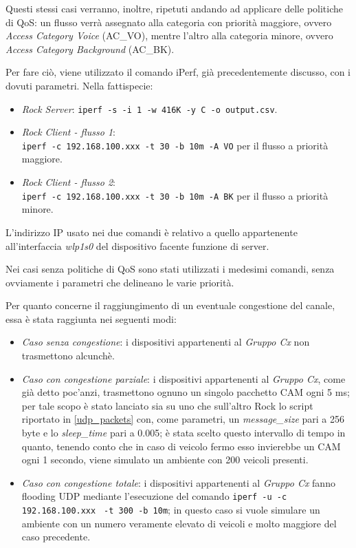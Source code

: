 Questi stessi casi verranno, inoltre, ripetuti andando ad applicare delle politiche di QoS: un flusso verrà assegnato alla categoria con priorità maggiore, ovvero \textit{Access Category Voice} (AC\_VO), mentre l'altro alla categoria minore, ovvero \textit{Access Category Background} (AC\_BK).

Per fare ciò, viene utilizzato il comando iPerf, già precedentemente discusso, con i dovuti parametri. Nella fattispecie:

\begin{itemize}
    \item \textit{Rock Server}: \verb|iperf -s -i 1 -w 416K -y C -o output.csv|.
    \item \textit{Rock Client - flusso 1}: \\\verb|iperf -c 192.168.100.xxx -t 30 -b 10m -A VO| per il flusso a priorità maggiore.
    \item \textit{Rock Client - flusso 2}: \\\verb|iperf -c 192.168.100.xxx -t 30 -b 10m -A BK| per il flusso a priorità minore.
\end{itemize}

L'indirizzo IP usato nei due comandi è relativo a quello appartenente all'interfaccia \textit{wlp1s0} del dispositivo facente funzione di server.

Nei casi senza politiche di QoS sono stati utilizzati i medesimi comandi, senza ovviamente i parametri che delineano le varie priorità.

Per quanto concerne il raggiungimento di un eventuale congestione del canale, essa è stata raggiunta nei seguenti modi:

\begin{itemize}
    \item \textit{Caso senza congestione}: i dispositivi appartenenti al \textit{Gruppo Cx} non trasmettono alcunchè.
    \item \textit{Caso con congestione parziale}: i dispositivi appartenenti al \textit{Gruppo Cx}, come già detto poc'anzi, trasmettono ognuno un singolo pacchetto CAM ogni 5 ms; per tale scopo è stato lanciato sia su uno che sull'altro Rock lo script riportato in \autoref{udp_packets} con, come parametri, un \textit{message\_size} pari a 256 byte e lo \textit{sleep\_time} pari a 0.005; è stata scelto questo intervallo di tempo in quanto, tenendo conto che in caso di veicolo fermo esso invierebbe un CAM ogni 1 secondo, viene simulato un ambiente con 200 veicoli presenti.
    \item \textit{Caso con congestione totale}: i dispositivi appartenenti al \textit{Gruppo Cx} fanno flooding UDP mediante l'esecuzione del comando \verb|iperf -u -c 192.168.100.xxx| \verb| -t 300 -b 10m|; in questo caso si vuole simulare un ambiente con un numero veramente elevato di veicoli e molto maggiore del caso precedente.
\end{itemize}

